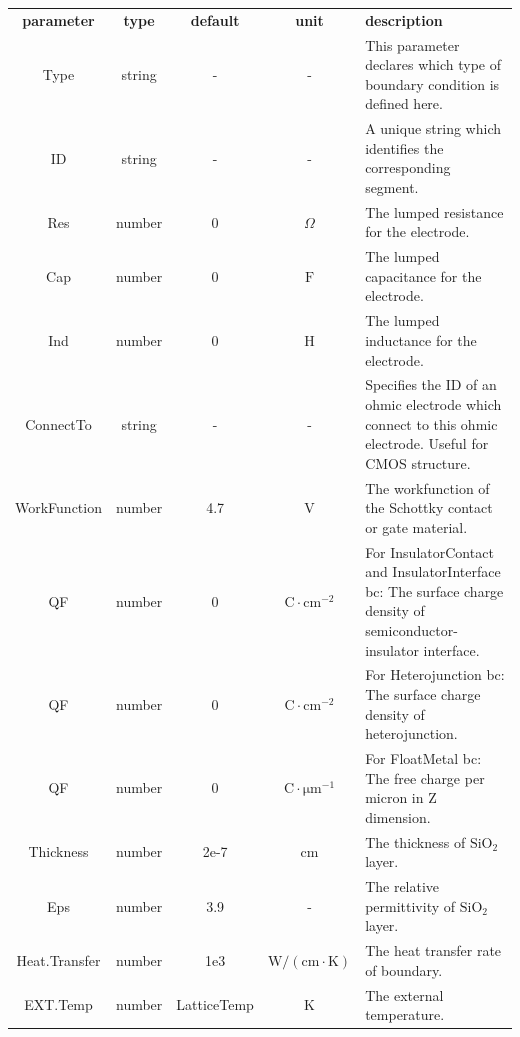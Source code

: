 \documentclass[11pt,pdftex]{article}
\begin{document}
\small
\noindent\begin{longtable}{ccccp{7cm}}
\textbf{parameter}   & \textbf{type}    & \textbf{default} & \textbf{unit} & \textbf{description} \\
Type          & string  & -  & -    & This parameter declares which type of boundary condition is defined here.\\
ID            & string  & -  & -    & A unique string which identifies the corresponding segment.\\
Res           & number  & 0  & $\Omega$      & The lumped resistance for the electrode.  \\
Cap           & number  & 0  & $\mathrm{F}$  & The lumped capacitance for the electrode. \\
Ind           & number  & 0  & $\mathrm{H}$  & The lumped inductance for the electrode. \\
ConnectTo     & string  & -  & -             & Specifies the ID of an ohmic electrode which connect to this ohmic electrode. Useful for CMOS structure.\\
WorkFunction  & number  &4.7 & $\mathrm{V}$  & The workfunction of the Schottky contact or gate material. \\
QF            & number  & 0  & $\mathrm{C}\cdot \mathrm{cm}^{-2}$  & For InsulatorContact and InsulatorInterface bc: The surface charge density of semiconductor-insulator interface. \\
QF            & number  & 0  & $\mathrm{C}\cdot \mathrm{cm}^{-2}$  & For Heterojunction bc: The surface charge density of heterojunction. \\
QF            & number  & 0  & $\mathrm{C}\cdot \mathrm{\mu m}^{-1}$  & For FloatMetal bc: The free charge per micron in Z dimension. \\
Thickness     & number  &2e-7  & $\mathrm{cm}$ & The thickness of $\mathrm{SiO}_2$ layer. \\
Eps           & number  &3.9   & -             & The relative permittivity of $\mathrm{SiO}_2$ layer.\\
Heat.Transfer & number  &1e3   &$\mathrm{W}/(\mathrm{cm}\cdot \mathrm{K})$   & The heat transfer rate of boundary. \\
EXT.Temp      & number  & LatticeTemp  & $\mathrm{K}$   & The external temperature. \\
\end{longtable}
\normalsize
\end{document}
